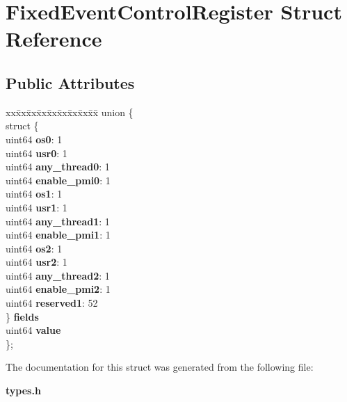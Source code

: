 \section{Fixed\+Event\+Control\+Register Struct Reference}
\label{structFixedEventControlRegister}
\subsection*{Public Attributes}
\begin{DoxyCompactItemize}
\item 
\mbox{\label{structFixedEventControlRegister_a89df1596d1ce4222132a4e117a20c9b1}} 
\begin{tabbing}
xx\=xx\=xx\=xx\=xx\=xx\=xx\=xx\=xx\=\kill
union \{\\
\>struct \{\\
\>\>uint64 {\bfseries os0}: 1\\
\>\>uint64 {\bfseries usr0}: 1\\
\>\>uint64 {\bfseries any\_thread0}: 1\\
\>\>uint64 {\bfseries enable\_pmi0}: 1\\
\>\>uint64 {\bfseries os1}: 1\\
\>\>uint64 {\bfseries usr1}: 1\\
\>\>uint64 {\bfseries any\_thread1}: 1\\
\>\>uint64 {\bfseries enable\_pmi1}: 1\\
\>\>uint64 {\bfseries os2}: 1\\
\>\>uint64 {\bfseries usr2}: 1\\
\>\>uint64 {\bfseries any\_thread2}: 1\\
\>\>uint64 {\bfseries enable\_pmi2}: 1\\
\>\>uint64 {\bfseries reserved1}: 52\\
\>\} {\bfseries fields}\\
\>uint64 {\bfseries value}\\
\}; \\

\end{tabbing}\end{DoxyCompactItemize}


The documentation for this struct was generated from the following file\+:\begin{DoxyCompactItemize}
\item 
\textbf{ types.\+h}\end{DoxyCompactItemize}
